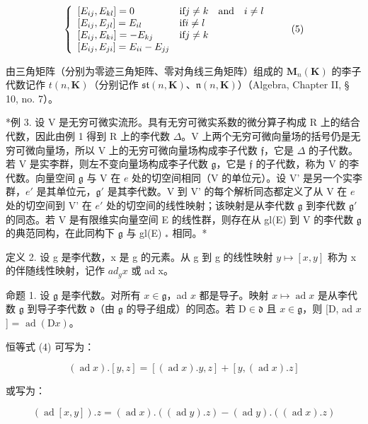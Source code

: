 \[
\left\{ \begin{array}{l l} [ E _ {i j}, E _ {k l} ] = 0 & \text {if} j \neq k \quad \text {and} \quad i \neq l \\ {} [ E _ {i j}, E _ {j l} ] = E _ {i l} & \text {if} i \neq l \\ {} [ E _ {i j}, E _ {k i} ] = - E _ {k j} & \text {if} j \neq k \\ {} [ E _ {i j}, E _ {j i} ] = E _ {i i} - E _ {j j} \end{array} \right.\tag{5}
\]

由三角矩阵（分别为零迹三角矩阵、零对角线三角矩阵）组成的 \(\mathbf{M}_{n}(\mathbf{K})\) 的李子代数记作 \(t(n,\mathbf{K})\)（分别记作 \(\mathfrak{st}(n,\mathbf{K})\)、\(\mathfrak{n}(n,\mathbf{K})\)）（Algebra, Chapter II, § 10, no. 7）。

*例 3. 设 V 是无穷可微实流形。具有无穷可微实系数的微分算子构成 R 上的结合代数，因此由例 1 得到 R 上的李代数 \(\Delta\)。V 上两个无穷可微向量场的括号仍是无穷可微向量场，所以 V 上的无穷可微向量场构成李子代数 \(\mathfrak{f}\)，它是 \(\Delta\) 的子代数。若 V 是实李群，则左不变向量场构成李子代数 \(\mathfrak{g}\)，它是 \(\mathfrak{f}\) 的子代数，称为 V 的李代数。向量空间 \(\mathfrak{g}\) 与 V 在 \(e\) 处的切空间相同（V 的单位元）。设 V' 是另一个实李群，\(e'\) 是其单位元，\(\mathfrak{g}'\) 是其李代数。V 到 V' 的每个解析同态都定义了从 V 在 \(e\) 处的切空间到 V' 在 \(e'\) 处的切空间的线性映射；该映射是从李代数 \(\mathfrak{g}\) 到李代数 \(\mathfrak{g}'\) 的同态。若 V 是有限维实向量空间 E 的线性群，则存在从 gl(E) 到 V 的李代数 \(\mathfrak{g}\) 的典范同构，在此同构下 \(\mathfrak{g}\) 与 gl(E) \(_*\) 相同。*

定义 2. 设 g 是李代数，x 是 g 的元素。从 g 到 g 的线性映射 \(y \mapsto [x, y]\) 称为 x 的伴随线性映射，记作 \(ad_{g}x\) 或 ad x。

命题 1. 设 \(\mathfrak{g}\) 是李代数。对所有 \(x \in \mathfrak{g}\)，ad \(x\) 都是导子。映射 \(x \mapsto \operatorname{ad} x\) 是从李代数 \(\mathfrak{g}\) 到导子李代数 \(\mathfrak{d}\)（由 \(\mathfrak{g}\) 的导子组成）的同态。若 \(\mathrm{D} \in \mathfrak{d}\) 且 \(x \in \mathfrak{g}\)，则 {[}D, ad \(x\) {]} = \(\operatorname{ad}(\mathrm{D}x)\)。

恒等式 (4) 可写为：

\[
(\operatorname{ad} x). [ y, z ] = [ (\operatorname{ad} x). y, z ] + [ y, (\operatorname{ad} x). z ]
\]

或写为：

\[
(\operatorname{ad} [ x, y ]). z = (\operatorname{ad} x). ((\operatorname{ad} y). z) - (\operatorname{ad} y). ((\operatorname{ad} x). z)
\]

